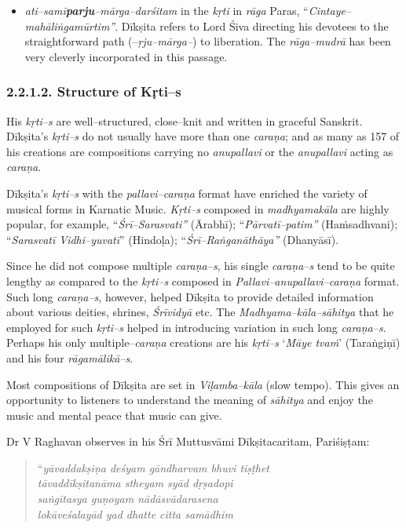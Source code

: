 \begin{itemize}
 \item \textit{ati–samī\textbf{parju}–mārga–darśitam} in the \textit{kṛti} in \textit{rāga} Paras, “\textit{Cintaye–mahāliṅgamūrtim”}. Dīkṣita refers to Lord Śiva directing his devotees to the straightforward path (–\textit{ṛju–mārga–}) to liberation. The \textit{rāga–mudrā} has been very cleverly incorporated in this passage.

\end{itemize}


\subsubsection*{2.2.1.2. Structure of Kṛti–s}

His \textit{kṛti–s} are well–structured, close–knit and written in graceful Sanskrit. Dīkṣita’s \textit{kṛti–s} do not usually have more than one \textit{caraṇa}; and as many as 157 of his creations are compositions carrying no \textit{anupallavi} or the \textit{anupallavi} acting as \textit{caraṇa}.

Dīkṣita’s \textit{kṛti–s} with the \textit{pallavi–caraṇa} format have enriched the variety of musical forms in Karnatic Music. \textit{Kṛti–s} composed in \textit{madhyamakāla} are highly popular, for example, “\textit{Śrī–Sarasvati”} (Ārabhī); “\textit{Pārvatī–patim”} (Haṁsadhvani); “\textit{Sarasvatī Vidhi–yuvatī}” (Hindoḷa); “\textit{Śrī–Raṅganāthāya”} (Dhanyāsī).

Since he did not compose multiple \textit{caraṇa–s}, his single \textit{caraṇa–s} tend to be quite lengthy as compared to the \textit{kṛti–s} composed in \textit{Pallavi–anupallavi–caraṇa} format. Such long \textit{caraṇa–s}, however, helped Dīkṣita to provide detailed information about various deities, shrines, \textit{Śrīvidyā} etc. The \textit{Madhyama–kāla–sāhitya} that he employed for such \textit{kṛti–s} helped in introducing variation in such long \textit{caraṇa–s}. Perhaps his only multiple–\textit{caraṇa} creations are his \textit{kṛti–s} ‘\textit{Māye tvaṁ}’ (Taraṅgiṇī) and his four \textit{rāgamālikā–s}.

Most compositions of Dīkṣita are set in \textit{Viḷamba–kāla} (slow tempo). This gives an opportunity to listeners to understand the meaning of \textit{sāhitya} and enjoy the music and mental peace that music can give.

Dr V Raghavan observes in his Śrī Muttusvāmi Dīkṣitacaritam, Pariśiṣṭam:

\begin{verse}
“\textit{yāvaddakṣiṇa deśyam gāndharvam bhuvi tiṣṭhet} \\\textit{tāvaddīkṣitanāma stheyam syād dṛṣadopi} \\\textit{saṅgītasya guṇoyam nādāsvādarasena} \\\textit{lokāveśalayād yad dhatte citta samādhim} 
\end{verse}

